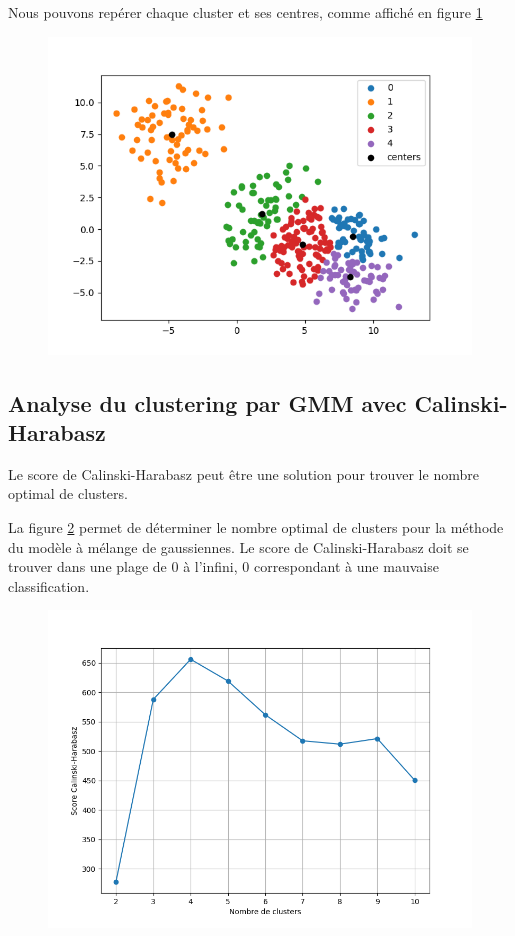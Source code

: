 \documentclass[french,a4paper,18pt]{article}
\begin{document}
Nous pouvons repérer chaque cluster et ses centres, comme affiché en figure \ref{fig:gmm_clusters_centers}

\begin{figure}[h!]
    \centering
    \includegraphics[scale=0.4]{images/gmm_clusters_centers.png}
    \caption{}\label{fig:gmm_clusters_centers}
\end{figure}

\subsection{Analyse du clustering par GMM avec Calinski-Harabasz}

Le score de Calinski-Harabasz peut être une solution pour trouver le nombre optimal de clusters.

La figure \ref{fig:gmm_ch_score} permet de déterminer le nombre optimal de clusters pour la méthode du modèle à mélange de gaussiennes.
Le score de Calinski-Harabasz doit se trouver dans une plage de 0 à l'infini, 0 correspondant à une mauvaise classification.

\begin{figure}[h!]
    \centering
    \includegraphics[scale=0.4]{images/calinski_harabasz_scores_gmm.png}
    \caption{}\label{fig:gmm_ch_score}
\end{figure}
\end{document}
